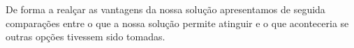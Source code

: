 De forma a realçar as vantagens da nossa solução apresentamos de seguida comparações entre o que a nossa solução permite atinguir e o que aconteceria se outras opções tivessem sido tomadas.



